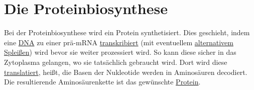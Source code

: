 \documentclass{article}
\begin{document}
\section{Die Proteinbiosynthese} 
Bei der Proteinbiosynthese wird ein Protein synthetisiert. Dies geschieht, indem eine \hyperref[DNA]{DNA} zu einer prä-mRNA \hyperref[Die Transkription]{transkribiert} (mit eventuellem \hyperref[Das Alternative Spleißen]{alternativem Spleißen}) wird bevor sie weiter prozessiert wird. So kann diese sicher in das Zytoplasma gelangen, wo sie tatsächlich gebraucht wird. Dort wird diese \hyperref[Die Translation]{translatiert}, heißt, die Basen der Nukleotide werden in Aminosäuren decodiert. Die resultierende Aminosäurenkette ist das gewünschte \hyperref[Proteine]{Protein}.
\end{document}
